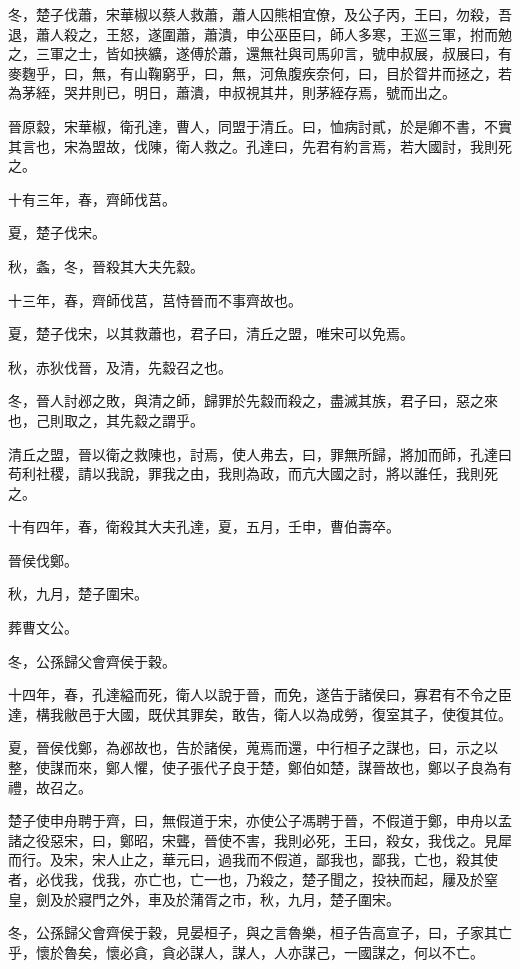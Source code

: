 \begin{pinyinscope}
冬，楚子伐蕭，宋華椒以蔡人救蕭，蕭人囚熊相宜僚，及公子丙，王曰，勿殺，吾退，蕭人殺之，王怒，遂圍蕭，蕭潰，申公巫臣曰，師人多寒，王巡三軍，拊而勉之，三軍之士，皆如挾纊，遂傅於蕭，還無社與司馬卯言，號申叔展，叔展曰，有麥麴乎，曰，無，有山鞠窮乎，曰，無，河魚腹疾奈何，曰，目於眢井而拯之，若為茅絰，哭井則已，明日，蕭潰，申叔視其井，則茅絰存焉，號而出之。

晉原縠，宋華椒，衛孔達，曹人，同盟于清丘。曰，恤病討貳，於是卿不書，不實其言也，宋為盟故，伐陳，衛人救之。孔達曰，先君有約言焉，若大國討，我則死之。

十有三年，春，齊師伐莒。

夏，楚子伐宋。

秋，螽，冬，晉殺其大夫先縠。

十三年，春，齊師伐莒，莒恃晉而不事齊故也。

夏，楚子伐宋，以其救蕭也，君子曰，清丘之盟，唯宋可以免焉。

秋，赤狄伐晉，及清，先縠召之也。

冬，晉人討邲之敗，與清之師，歸罪於先縠而殺之，盡滅其族，君子曰，惡之來也，己則取之，其先縠之謂乎。

清丘之盟，晉以衛之救陳也，討焉，使人弗去，曰，罪無所歸，將加而師，孔達曰苟利社稷，請以我說，罪我之由，我則為政，而亢大國之討，將以誰任，我則死之。

十有四年，春，衛殺其大夫孔達，夏，五月，壬申，曹伯壽卒。

晉侯伐鄭。

秋，九月，楚子圍宋。

葬曹文公。

冬，公孫歸父會齊侯于穀。

十四年，春，孔達縊而死，衛人以說于晉，而免，遂告于諸侯曰，寡君有不令之臣達，構我敝邑于大國，既伏其罪矣，敢告，衛人以為成勞，復室其子，使復其位。

夏，晉侯伐鄭，為邲故也，告於諸侯，蒐焉而還，中行桓子之謀也，曰，示之以整，使謀而來，鄭人懼，使子張代子良于楚，鄭伯如楚，謀晉故也，鄭以子良為有禮，故召之。

楚子使申舟聘于齊，曰，無假道于宋，亦使公子馮聘于晉，不假道于鄭，申舟以孟諸之役惡宋，曰，鄭昭，宋聾，晉使不害，我則必死，王曰，殺女，我伐之。見犀而行。及宋，宋人止之，華元曰，過我而不假道，鄙我也，鄙我，亡也，殺其使者，必伐我，伐我，亦亡也，亡一也，乃殺之，楚子聞之，投袂而起，屨及於窒皇，劍及於寢門之外，車及於蒲胥之市，秋，九月，楚子圍宋。

冬，公孫歸父會齊侯于穀，見晏桓子，與之言魯樂，桓子告高宣子，曰，子家其亡乎，懷於魯矣，懷必貪，貪必謀人，謀人，人亦謀己，一國謀之，何以不亡。


\end{pinyinscope}
